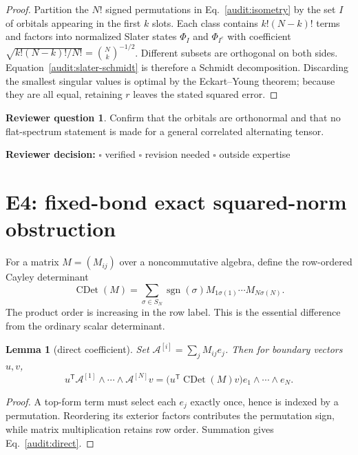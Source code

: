 \documentclass[11pt]{article}
\newtheorem{lemma}[theorem]{Lemma}
\theoremstyle{definition}
\newtheorem*{reviewquestion}{Reviewer question}
\newcommand{\CDet}{\operatorname{CDet}}
\newcommand{\reviewline}{\par\smallskip\noindent
  \textbf{Reviewer decision:} $\square$ verified \quad $\square$ revision
  needed \quad $\square$ outside expertise\par\medskip}
\begin{document}
\begin{proof}
Partition the $N!$ signed permutations in Eq.~\eqref{audit:isometry} by the set
$I$ of orbitals appearing in the first $k$ slots.  Each class contains
$k!(N-k)!$ terms and factors into normalized Slater states $\Phi_I$ and
$\Phi_{I^c}$ with coefficient
$\sqrt{k!(N-k)!/N!}=\binom Nk^{-1/2}$.  Different subsets are orthogonal on
both sides.  Equation~\eqref{audit:slater-schmidt} is therefore a Schmidt
decomposition.  Discarding the smallest singular values is optimal by the
Eckart--Young theorem; because they are all equal, retaining $r$ leaves the
stated squared error.
\end{proof}

\begin{reviewquestion}
Confirm that the orbitals are orthonormal and that no flat-spectrum statement
is made for a general correlated alternating tensor.
\end{reviewquestion}
\reviewline

\section{E4: fixed-bond exact squared-norm obstruction}

For a matrix $M=(M_{ij})$ over a noncommutative algebra, define the
row-ordered Cayley determinant
\begin{equation}
\CDet(M)=\sum_{\sigma\in S_N}\operatorname{sgn}(\sigma)
M_{1\sigma(1)}\cdots M_{N\sigma(N)}.
\label{audit:cayley}
\end{equation}
The product order is increasing in the row label.  This is the essential
difference from the ordinary scalar determinant.

\begin{lemma}[direct coefficient]
Set $\mathcal A^{[i]}=\sum_jM_{ij}e_j$.  Then for boundary vectors $u,v$,
\begin{equation}
u^{\mathsf T}\mathcal A^{[1]}\wedge\cdots\wedge
\mathcal A^{[N]}v
=\bigl(u^{\mathsf T}\CDet(M)v\bigr)e_1\wedge\cdots\wedge e_N.
\label{audit:direct}
\end{equation}
\end{lemma}

\begin{proof}
A top-form term must select each $e_j$ exactly once, hence is indexed by a
permutation.  Reordering its exterior factors contributes the permutation
sign, while matrix multiplication retains row order.  Summation gives
Eq.~\eqref{audit:direct}.
\end{proof}
\end{document}
